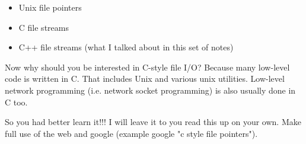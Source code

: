 \documentclass[
]{article}
\providecommand{\tightlist}{%
  \setlength{\itemsep}{0pt}\setlength{\parskip}{0pt}}
\begin{document}
\begin{itemize}
\tightlist
\item
  Unix file pointers
\item
  C file streams
\item
  C++ file streams (what I talked about in this set of notes)
\end{itemize}

Now why should you be interested in C-style file I/O? Because many
low-level code is written in C. That includes Unix and various unix
utilities. Low-level network programming (i.e. network socket
programming) is also usually done in C too.

So you had better learn it!!! I will leave it to you read this up on
your own. Make full use of the web and google (example google "c style
file pointers").
\end{document}
